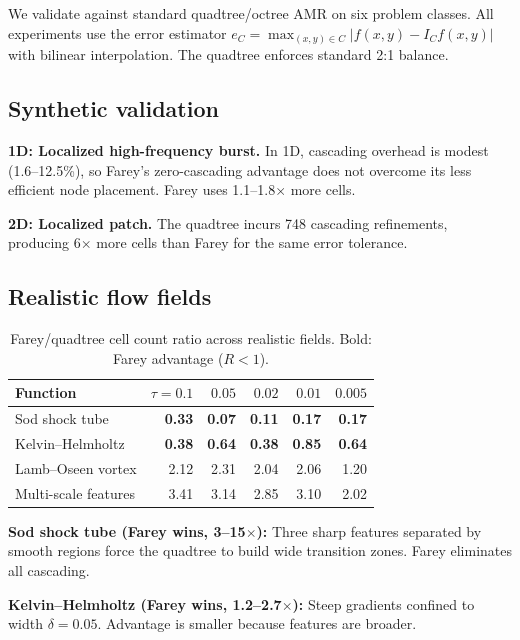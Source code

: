 \documentclass[11pt]{article}
\theoremstyle{definition}
\begin{document}
We validate against standard quadtree/octree AMR on six problem
classes. All experiments use the error estimator
$e_C = \max_{(x,y) \in C} |f(x,y) - I_C f(x,y)|$ with bilinear
interpolation. The quadtree enforces standard 2:1 balance.

\subsection{Synthetic validation}

\textbf{1D: Localized high-frequency burst.} In 1D, cascading
overhead is modest (1.6--12.5\%), so Farey's zero-cascading
advantage does not overcome its less efficient node placement.
Farey uses 1.1--1.8$\times$ more cells.

\textbf{2D: Localized patch.} The quadtree incurs 748 cascading
refinements, producing 6$\times$ more cells than Farey for the
same error tolerance.

\subsection{Realistic flow fields}

\begin{table}[ht]
\centering
\caption{Farey/quadtree cell count ratio across realistic fields.
Bold: Farey advantage ($R < 1$).}
\label{tab:flow-fields}
\begin{tabular}{lrrrrr}
\toprule
Function & $\tau=0.1$ & $0.05$ & $0.02$ & $0.01$ & $0.005$ \\
\midrule
Sod shock tube     & \textbf{0.33} & \textbf{0.07} &
  \textbf{0.11} & \textbf{0.17} & \textbf{0.17} \\
Kelvin--Helmholtz  & \textbf{0.38} & \textbf{0.64} &
  \textbf{0.38} & \textbf{0.85} & \textbf{0.64} \\
Lamb--Oseen vortex & 2.12 & 2.31 & 2.04 & 2.06 & 1.20 \\
Multi-scale features & 3.41 & 3.14 & 2.85 & 3.10 & 2.02 \\
\bottomrule
\end{tabular}
\end{table}

\textbf{Sod shock tube (Farey wins, 3--15$\times$):} Three sharp
features separated by smooth regions force the quadtree to build
wide transition zones. Farey eliminates all cascading.

\textbf{Kelvin--Helmholtz (Farey wins, 1.2--2.7$\times$):} Steep
gradients confined to width $\delta = 0.05$. Advantage is smaller
because features are broader.
\end{document}
